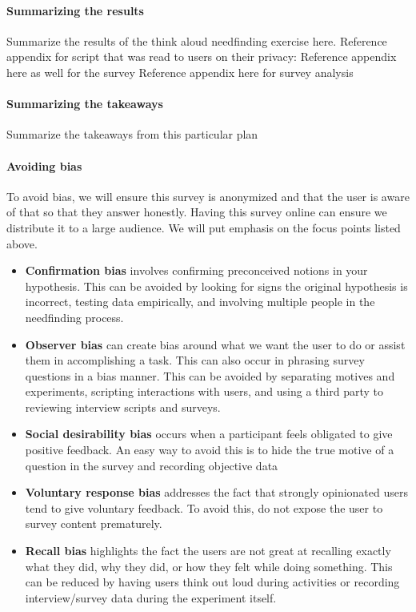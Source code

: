 \paragraph{Summarizing the results}
Summarize the results of the think aloud needfinding exercise here.
Reference appendix for script that was read to users on their privacy:
Reference appendix here as well for the survey
Reference appendix here for survey analysis

\paragraph{Summarizing the takeaways}
Summarize the takeaways from this particular plan

\paragraph{Avoiding bias}
To avoid bias, we will ensure this survey is anonymized and that the user is aware of that so that they answer honestly. Having this survey online can ensure we distribute it to a large audience. We will put emphasis on the focus points listed above.

\begin{itemize}
\item
  \textbf{Confirmation bias} involves confirming preconceived notions in your hypothesis. This can be avoided by looking for signs the original hypothesis is incorrect, testing data empirically, and involving multiple people in the needfinding process.
\item
  \textbf{Observer bias} can create bias around what we want the user to do or assist them in accomplishing a task. This can also occur in phrasing survey questions in a bias manner. This can be avoided by separating motives and experiments, scripting interactions with users, and using a third party to reviewing interview scripts and surveys.
\item
  \textbf{Social desirability bias} occurs when a participant feels obligated to give positive feedback. An easy way to avoid this is to hide the true motive of a question in the survey and recording objective data
\item
  \textbf{Voluntary response bias} addresses the fact that strongly opinionated users tend to give voluntary feedback. To avoid this, do not expose the user to survey content prematurely.
\item
  \textbf{Recall bias} highlights the fact the users are not great at recalling exactly what they did, why they did, or how they felt while doing something. This can be reduced by having users think out loud during activities or recording interview/survey data during the experiment itself.
\end{itemize}



